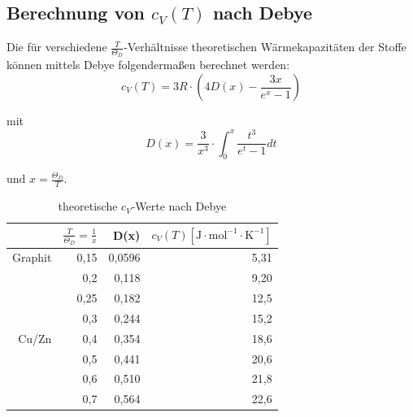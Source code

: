 \documentclass[12pt,a4paper,titlepage,headinclude,bibtotoc]{scrartcl}
\begin{document}
\subsection{Berechnung von $c_{V}(T)$ nach Debye}
Die für verschiedene $\frac{T}{\Theta_{D}}$-Verhältnisse theoretischen Wärmekapazitäten der Stoffe können mittels Debye folgendermaßen berechnet werden:\\

\begin{equation}
c_{V}(T)= 3R \cdot \left(4 D(x) - \frac{3x}{e^x -1}\right)
\end{equation}

mit \\

\begin{equation}
D(x) = \frac{3}{x^3}\cdot \int_{0}^{x} \frac{t^3}{e^t -1} dt
\end{equation}

und $x= \frac{\Theta_D}{T}$.


\begin{table} [h]
\centering
\caption{theoretische $c_V$-Werte nach Debye}
\begin{tabular} {r | r|  r | r}
&$\frac{T}{\Theta_D}=\frac{1}{x}$& D(x)&$c_V(T)[\mathrm{J}\cdot \mathrm{mol}^{-1} \cdot \mathrm{K}^{-1}]$\\
\hline
Graphit	&0,15&	0,0596	&5,31\\
	&0,2&	0,118	&9,20\\
	&0,25	&0,182&	12,5\\
	&0,3	&0,244	&15,2\\
	\hline			
Cu/Zn &	0,4	&0,354&	18,6\\
	&0,5&	0,441	&20,6\\
	&0,6	&0,510	&21,8\\
	&0,7&	0,564&22,6\\

\end{tabular}
\end{table}

\FloatBarrier
\end{document}
